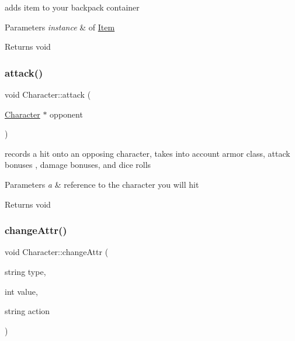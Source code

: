 adds item to your backpack container 
\begin{DoxyParams}{Parameters}
{\em instance} & of \hyperlink{class_item}{Item} \\
\hline
\end{DoxyParams}
\begin{DoxyReturn}{Returns}
void 
\end{DoxyReturn}
\hypertarget{class_character_acad4e0ee6d71fe3a120b36c7d7082c01}{}\label{class_character_acad4e0ee6d71fe3a120b36c7d7082c01} 
\subsubsection{\texorpdfstring{attack()}{attack()}}
{\footnotesize\ttfamily void Character\+::attack (\begin{DoxyParamCaption}\item[{\hyperlink{class_character}{Character} $\ast$}]{opponent }\end{DoxyParamCaption})}

records a hit onto an opposing character, takes into account armor class, attack bonuses , damage bonuses, and dice rolls 
\begin{DoxyParams}{Parameters}
{\em a} & reference to the character you will hit \\
\hline
\end{DoxyParams}
\begin{DoxyReturn}{Returns}
void 
\end{DoxyReturn}
\hypertarget{class_character_a22626ae2ff021944ef418500e74ae809}{}\label{class_character_a22626ae2ff021944ef418500e74ae809} 
\subsubsection{\texorpdfstring{change\+Attr()}{changeAttr()}}
{\footnotesize\ttfamily void Character\+::change\+Attr (\begin{DoxyParamCaption}\item[{string}]{type,  }\item[{int}]{value,  }\item[{string}]{action }\end{DoxyParamCaption})}


